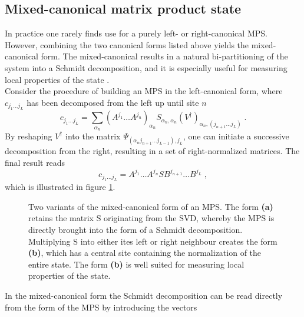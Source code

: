 \subsection{Mixed-canonical matrix product state}
In practice one rarely finds use for a purely left- or right-canonical MPS. However, combining the two canonical forms listed above yields the mixed-canonical form. The mixed-canonical results in a natural bi-partitioning of the system into a Schmidt decomposition, and it is especially useful for measuring local properties of the state \cite{schollwock}.\\
Consider the procedure of building an MPS in the left-canonical form, where $c_{j_1 \ldots j_L}$ has been decomposed from the left up until site $n$
\begin{equation}
	c_{j_1 \ldots j_L} = \sum_{\alpha_n} \left( A^{j_1} \ldots  A^{j_n} \right) _{\alpha_n} S_{\alpha_n , \alpha_n} (V^{\dag})_{\alpha_n , (j_{n+1} \ldots j_L)} \; .
\end{equation}
By reshaping $V^{\dag}$  into the matrix $\Psi_{(\alpha_n j_{n+1} \ldots j_{L-1}),j_L}$, one can initiate a successive decomposition from the right, resulting in a set of right-normalized matrices. The final result reads
\begin{equation}
	c_{j_1 \ldots j_L} = A^{j_1} \ldots A^{j_n} S B^{j_{n+1}} \ldots B^{j_L} \; ,
	\label{eq:mixedCanon}
\end{equation}
which is illustrated in figure \ref{fig:MixedCanonical1}.
\begin{figure}[h!]
\centering %
\begin{subfigure}[b]{0.47\textwidth}
	\caption{}  	
  	
	\label{fig:MixedCanonical1}
\end{subfigure}
\hspace{5mm}
\begin{subfigure}[b]{0.47\textwidth}    
	\caption{}  	
  	
	\label{fig:MixedCanonical2}
\end{subfigure}
\caption{Two variants of the mixed-canonical form of an MPS. The form \textbf{(a)} retains the matrix S originating from the SVD, whereby the MPS is directly brought into the form of a Schmidt decomposition. Multiplying S into either ites left or right neighbour creates the form \textbf{(b)}, which has a central site containing the normalization of the entire state. The form \textbf{(b)} is well suited for measuring local properties of the state.}
\end{figure}
In the mixed-canonical form the Schmidt decomposition can be read directly from the form of the MPS by introducing the vectors
